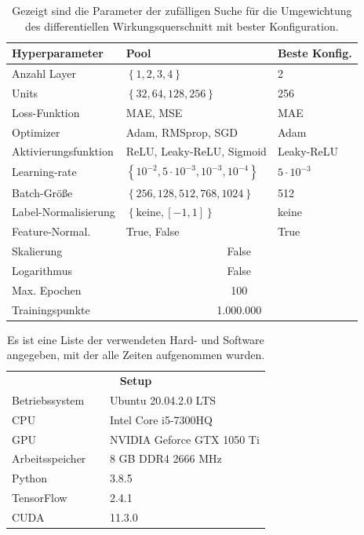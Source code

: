 \begin{table}
	\centering
	\caption{Gezeigt sind die Parameter der zufälligen Suche für die Umgewichtung des differentiellen Wirkungsquerschnitt mit bester Konfiguration.}
	\begin{tabular}{lll}
		Hyperparameter & Pool & Beste Konfig. \\
		\hline\hline
		Anzahl Layer & $\left\lbrace 1,2,3,4\right\rbrace$ & 2 \\
		Units &$\left\lbrace 32, 64, 128, 256\right\rbrace$ & 256 \\
		Loss-Funktion & MAE, MSE & MAE \\
		Optimizer & Adam, RMSprop, SGD  & Adam\\
		Aktivierungsfunktion & ReLU, Leaky-ReLU, Sigmoid & Leaky-ReLU \\
		Learning-rate & $\left\lbrace 10^{-2}, 5 \cdot 10^{-3}, 10^{-3}, 10^{-4} \right\rbrace $ & $5 \cdot 10^{-3}$\\
		Batch-Größe & $\left\lbrace 256, 128, 512, 768, 1024 \right\rbrace $ & 512\\
		Label-Normalisierung & $\left\lbrace \text{keine}, [-1,1]\right\rbrace $ & keine\\
		Feature-Normal. & True, False & True \\
		\hline
		Skalierung & \multicolumn{2}{c}{False} \\
		Logarithmus & \multicolumn{2}{c}{False} \\ 
		Max. Epochen & \multicolumn{2}{c}{100}\\
		Trainingspunkte & \multicolumn{2}{c}{1.000.000} \\
		\hline
	\end{tabular}
	\label{hyperparameter-reweighting}
\end{table}
\begin{table}
	\centering
	\caption{Es ist eine Liste der verwendeten Hard- und Software angegeben, mit der alle Zeiten aufgenommen wurden.}
	\begin{tabular}{ll}
		\multicolumn{2}{c}{\textbf{Setup}} \\[5pt]
		Betriebssystem $\quad$& Ubuntu 20.04.2.0 LTS \\
		CPU & Intel Core  i5-7300HQ \\
		GPU & NVIDIA Geforce GTX 1050 Ti \\
		Arbeitsspeicher & 8 GB DDR4 2666 MHz \\
		Python & 3.8.5 \\
		TensorFlow & 2.4.1 \\
		CUDA & 11.3.0 \\
	\end{tabular}
	\label{hardware}
\end{table}
